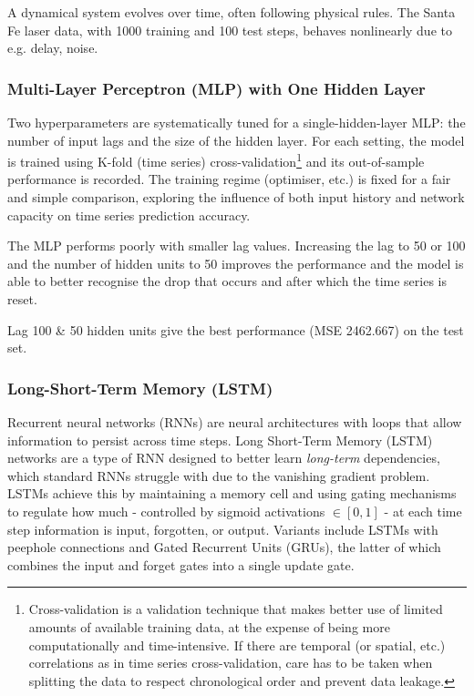 A dynamical system evolves over time, often following physical rules.
The Santa Fe laser data, with 1000 training and 100 test steps, behaves nonlinearly due to e.g. delay, noise.

\subsubsection{Multi-Layer Perceptron (MLP) with One Hidden Layer}

Two hyperparameters are systematically tuned for a single-hidden-layer MLP:
the number of input lags and the size of the hidden layer.
For each setting, the model is trained using K-fold (time series) cross-validation\footnote{
    Cross-validation is a validation technique that makes better use of limited amounts of available training data,
    at the expense of being more computationally and time-intensive.
    If there are temporal (or spatial, etc.) correlations as in time series cross-validation,
    care has to be taken when splitting the data to respect chronological order and prevent data leakage.
} and its out-of-sample performance is recorded.
The training regime (optimiser, etc.) is fixed for a fair and simple comparison,
exploring the influence of both input history and network capacity on time series prediction accuracy.

The MLP performs poorly with smaller lag values.
Increasing the lag to 50 or 100 and the number of hidden units to 50 improves the performance
and the model is able to better recognise the drop that occurs and after which the time series is reset.

Lag 100 \& 50 hidden units give the best performance (MSE 2462.667) on the test set.

\subsubsection{Long-Short-Term Memory (LSTM)}

Recurrent neural networks (RNNs) are neural architectures with loops that allow information to persist across time steps.
Long Short-Term Memory (LSTM) networks are a type of RNN designed to better learn \textit{long-term} dependencies, which standard RNNs struggle with due to the vanishing gradient problem.
LSTMs achieve this by maintaining a memory cell and using gating mechanisms to regulate how much - controlled by sigmoid activations $\in [0, 1]$ - at each time step information is input, forgotten, or output.
Variants include LSTMs with peephole connections and Gated Recurrent Units (GRUs), the latter of which combines the input and forget gates into a single update gate. \citep{olah2015understanding}

